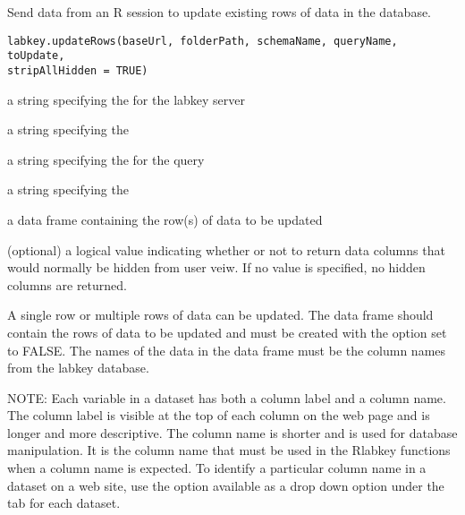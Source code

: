\documentclass{book}
\begin{document}
\begin{Description}\relax
Send data from an R session to update existing rows of data in the database.
\end{Description}
\begin{Usage}
\begin{verbatim}
labkey.updateRows(baseUrl, folderPath, schemaName, queryName, toUpdate, 
stripAllHidden = TRUE)
\end{verbatim}
\end{Usage}
\begin{Arguments}
\begin{ldescription}
\item[\code{baseUrl}] a string specifying the for the labkey server
\item[\code{folderPath}] a string specifying the  
\item[\code{schemaName}] a string specifying the  for the query
\item[\code{queryName}] a string specifying the  
\item[\code{toUpdate}] a data frame containing the row(s) of data to be updated
\item[\code{stripAllHidden}] (optional) a logical value indicating whether or not to return data columns that would 
normally be hidden from user veiw. If no value is specified, no hidden columns are returned.
\end{ldescription}
\end{Arguments}
\begin{Details}\relax
A single row or multiple rows of data can be updated.  The  data frame should contain 
the rows of data to be updated and must be created with the  option
set to FALSE. The names of the data in the data frame must be the column names from the
labkey database. 

NOTE: Each variable in a dataset has both a column label and a column name. The column label is visible at the top
of each column on the web page and is longer and more descriptive. The column name is shorter and is
used  for database manipulation. It is the column name that must be used in
the Rlabkey functions when a column name is expected. To identify a particular column name in a dataset on
a web site, use the  option available as a drop down option under the 
tab for each dataset.
\end{Details}
\end{document}
